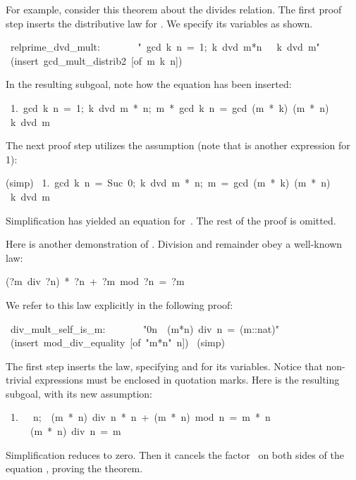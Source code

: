 For example, consider this theorem about the divides relation.  The first
proof step inserts the distributive law for
.  We specify its variables as shown. 
\begin{isabelle}
\ relprime\_dvd\_mult:\ \isanewline
\ \ \ \ \ \ "\isasymlbrakk \ gcd\ k\ n\ =\ 1;\ k\ dvd\ m*n\ \isasymrbrakk \ \isasymLongrightarrow \ k\ dvd\ m"\isanewline
{}\ (insert\ gcd_mult_distrib2\ [of\ m\ k\ n])
\end{isabelle}
In the resulting subgoal, note how the equation has been 
inserted: 
\begin{isabelle}
\ 1.\ \isasymlbrakk gcd\ k\ n\ =\ 1;\ k\ dvd\ m\ *\ n;\ m\ *\ gcd\ k\ n\ =\ gcd\ (m\ *\ k)\ (m\ *\ n)\isasymrbrakk \isanewline
{}\isasymLongrightarrow \ k\ dvd\ m%
\end{isabelle}
The next proof step utilizes the assumption 
(note that  is another expression for 1):
\begin{isabelle}
(simp)\isanewline
\ 1.\ \isasymlbrakk gcd\ k\ n\ =\ Suc\ 0;\ k\ dvd\ m\ *\ n;\ m\ =\ gcd\ (m\ *\ k)\ (m\ *\ n)\isasymrbrakk \isanewline
{}\isasymLongrightarrow \ k\ dvd\ m%
\end{isabelle}
Simplification has yielded an equation for~.  The rest of the proof
is omitted.

\medskip
Here is another demonstration of .  Division and
remainder obey a well-known law: 
\begin{isabelle}
(?m\ div\ ?n)\ *\ ?n\ +\ ?m\ mod\ ?n\ =\ ?m
\end{isabelle}

We refer to this law explicitly in the following proof: 
\begin{isabelle}
\ div_mult_self_is_m:\ \isanewline
\ \ \ \ \ \ "0{\isacharless}n\ \isasymLongrightarrow\ (m*n)\ div\ n\ =\
(m::nat)"\isanewline
{}\ (insert\ mod_div_equality\ [of\ "m*n"\ n])\isanewline
\isacommand{apply}\ (simp)\isanewline
{}
\end{isabelle}
The first step inserts the law, specifying  and
 for its variables.  Notice that non-trivial expressions must be
enclosed in quotation marks.  Here is the resulting 
subgoal, with its new assumption: 
\begin{isabelle}
\ 1.\ \ \isacharless\
n;\ \ (m\ *\ n)\ div\ n\ *\ n\ +\ (m\ *\ n)\ mod\ n\
=\ m\ *\ n\isasymrbrakk\isanewline
\ \ \ \ \isasymLongrightarrow\ (m\ *\ n)\ div\ n\
=\ m
\end{isabelle}
Simplification reduces  to zero.
Then it cancels the factor~\isa{n} on both
sides of the equation , proving the
theorem.

